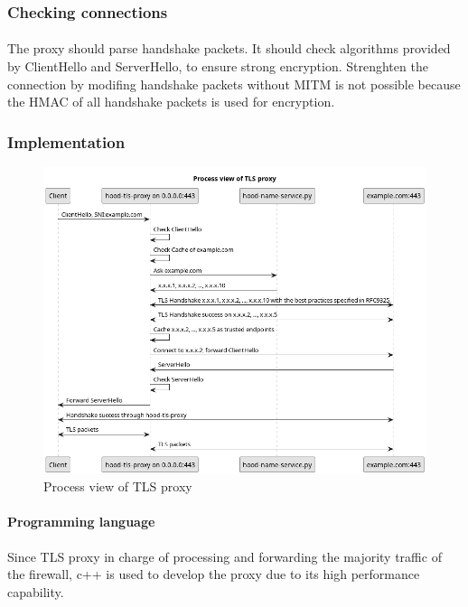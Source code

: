\documentclass[mscthesis]{usiinfthesis}
\begin{document}
\subsubsection{Checking connections}
\paragraph{}
The proxy should parse handshake packets. It should check algorithms provided by ClientHello and ServerHello, to ensure strong encryption. Strenghten the connection by modifing handshake packets without MITM is not possible because the HMAC of all handshake packets is used for encryption.
\subsubsection{Implementation}

\begin{figure}[H]
  \includegraphics[width=\textwidth]{graphics/puml/process-tls-proxy.png}
  \caption{Process view of TLS proxy}
  \label{fig:tls-proxy-process-view}
\end{figure}

\paragraph{Programming language}
Since TLS proxy in charge of processing and forwarding the majority traffic of the firewall, c++ is used to develop the proxy due to its high performance capability.
\end{document}
